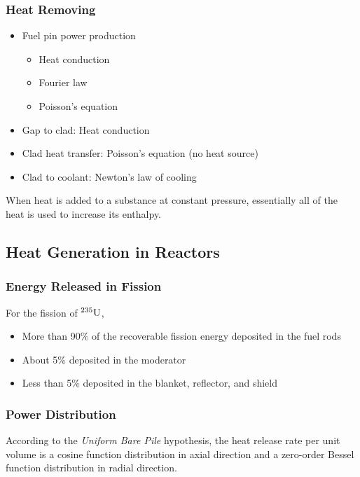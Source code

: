\subsubsection*{Heat Removing}

\begin{itemize}
    \item Fuel pin power production
    \begin{itemize}
        \item Heat conduction
        \item Fourier law
        \item Poisson's equation
    \end{itemize}
    \item Gap to clad: Heat conduction
    \item Clad heat transfer: Poisson's equation (no heat source)
    \item Clad to coolant: Newton's law of cooling
\end{itemize}

When heat is added to a substance at constant pressure, essentially all of the heat is used to increase its enthalpy.

\subsection{Heat Generation in Reactors}

\subsubsection*{Energy Released in Fission}

For the fission of ${}^{235}{\rm U}$, 

\begin{itemize}
    \item More than 90\% of the recoverable fission energy deposited in the fuel rods
    \item About 5\% deposited in the moderator
    \item Less than 5\% deposited in the blanket, reflector, and shield
\end{itemize}

\subsubsection*{Power Distribution}

According to the {\itshape Uniform Bare Pile} hypothesis, the heat release rate per unit volume is a cosine function distribution in axial direction and a zero-order Bessel function distribution in radial direction.

